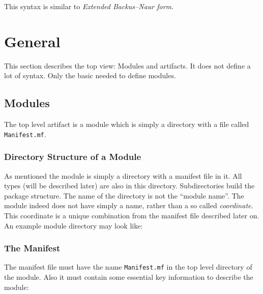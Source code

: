 \documentclass[11pt,a4paper]{report}
\begin{document}
This syntax is similar to \textit{Extended Backus–Naur form}\cite{ebnf-wiki}.

\chapter{General}

This section describes the top view: Modules and artifacts. It does not define a lot of syntax. Only the basic needed to define modules.

\section{Modules}

The top level artifact is a module which is simply a directory with a file called \texttt{Manifest.mf}.

\subsection{Directory Structure of a Module}

As mentioned the module is simply a directory with a manifest file in it. All types (will be described later) are also in this directory. Subdirectories build the package structure. The name of the directory is not the ``module name''. The module indeed does not have simply a name, rather than a so called \textit{coordinate}. This coordinate is a unique combination from the manifest file described later on. An example module directory may look like:
\\

\subsection{The Manifest}

The manifest file must have the name \texttt{Manifest.mf} in the top level directory of the module. Also it must contain some essential key information to describe the module:
\end{document}
